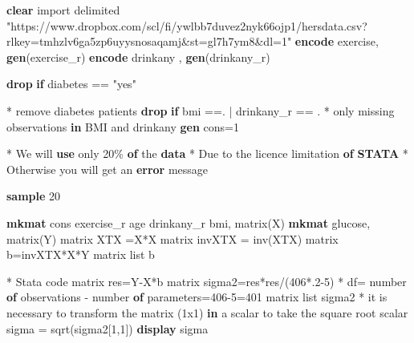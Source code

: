 \documentclass[
  letterpaper,
  DIV=11,
  numbers=noendperiod]{scrreprt}
\newenvironment{Shaded}{\begin{snugshade}}{\end{snugshade}}
\newcommand{\FunctionTok}[1]{\textcolor[rgb]{0.28,0.35,0.67}{#1}}
\newcommand{\KeywordTok}[1]{\textcolor[rgb]{0.00,0.23,0.31}{\textbf{#1}}}
\newcommand{\NormalTok}[1]{\textcolor[rgb]{0.00,0.23,0.31}{#1}}
\newcommand{\OtherTok}[1]{\textcolor[rgb]{0.00,0.23,0.31}{#1}}
\newcommand{\StringTok}[1]{\textcolor[rgb]{0.13,0.47,0.30}{#1}}
\begin{document}
\begin{Shaded}
\begin{Highlighting}[]
\KeywordTok{clear}
\NormalTok{import delimited }\StringTok{"https://www.dropbox.com/scl/fi/ywlbb7duvez2nyk66ojp1/hersdata.csv?rlkey=tmhzlv6ga5zp6uyysnosaqamj\&st=gl7h7ym8\&dl=1"}
\KeywordTok{encode}\NormalTok{  exercise, }\KeywordTok{gen}\NormalTok{(exercise\_r)}
\KeywordTok{encode}\NormalTok{ drinkany , }\KeywordTok{gen}\NormalTok{(drinkany\_r)}

\KeywordTok{drop} \KeywordTok{if}\NormalTok{ diabetes == }\StringTok{"yes"}

\NormalTok{* remove diabetes patients}
\KeywordTok{drop} \KeywordTok{if}\NormalTok{ bmi ==. | drinkany\_r == . }
\NormalTok{* only }\FunctionTok{missing}\NormalTok{ observations }\KeywordTok{in}\NormalTok{ BMI and drinkany}
\KeywordTok{gen}\NormalTok{ cons=1}

\NormalTok{* We will }\KeywordTok{use}\NormalTok{ only 20\% }\KeywordTok{of}\NormalTok{ the }\KeywordTok{data}
\NormalTok{* Due to the licence limitation }\KeywordTok{of} \KeywordTok{STATA}
\NormalTok{* Otherwise you will }\FunctionTok{get}\NormalTok{ an }\KeywordTok{error}\NormalTok{ message}

\KeywordTok{sample}\NormalTok{ 20}

\KeywordTok{mkmat}\NormalTok{ cons exercise\_r age drinkany\_r bmi, }\FunctionTok{matrix}\NormalTok{(X) }
\KeywordTok{mkmat}\NormalTok{ glucose, }\FunctionTok{matrix}\NormalTok{(Y)}
\FunctionTok{matrix}\NormalTok{ XTX =X\textquotesingle{}*X}
\FunctionTok{matrix}\NormalTok{ invXTX = }\FunctionTok{inv}\NormalTok{(XTX)}
\FunctionTok{matrix}\NormalTok{ b=invXTX*X\textquotesingle{}*Y}
\FunctionTok{matrix} \OtherTok{list}\NormalTok{ b }

\NormalTok{* Stata code}
\FunctionTok{matrix}\NormalTok{ res=Y{-}X*b}
\FunctionTok{matrix}\NormalTok{ sigma2=res\textquotesingle{}*res/(406*.2{-}5)}
\NormalTok{* df= number }\KeywordTok{of}\NormalTok{ observations {-} number }\KeywordTok{of}\NormalTok{ parameters=406{-}5=401}
\FunctionTok{matrix} \OtherTok{list}\NormalTok{ sigma2}
\NormalTok{* it is necessary to transform the }\FunctionTok{matrix}\NormalTok{ (1x1) }\KeywordTok{in}\NormalTok{ a }\FunctionTok{scalar}\NormalTok{ to take the square root}
\FunctionTok{scalar}\NormalTok{ sigma = }\FunctionTok{sqrt}\NormalTok{(sigma2[1,1])}
\KeywordTok{display}\NormalTok{ sigma}



\end{Highlighting}
\end{Shaded}
\end{document}
